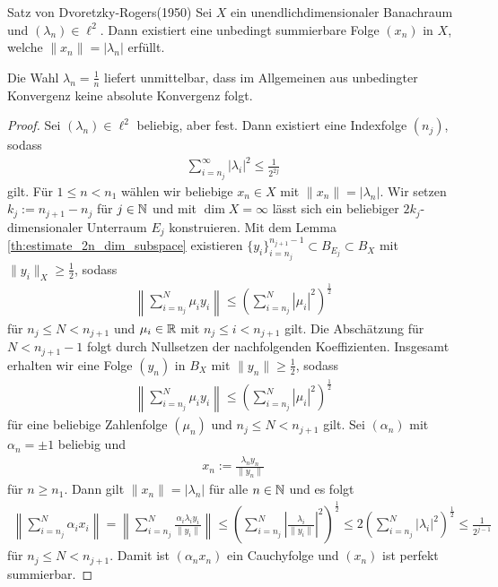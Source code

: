 \begin{genericthm}{Satz von Dvoretzky-Rogers(1950)}\label{th:dvoretzky_rogers}
	Sei $ X $ ein unendlichdimensionaler Banachraum und $ (\lambda_n) \in \ell^2 $.
	Dann existiert eine unbedingt summierbare Folge $ (x_n)  $ in $ X $, welche $  \| x_n \| = | \lambda_n | $ erfüllt.
\end{genericthm}
Die Wahl $ \lambda_n = \frac{1}{n} $ liefert unmittelbar, dass im Allgemeinen aus unbedingter Konvergenz keine absolute Konvergenz folgt.

\begin{proof}
	Sei $ (\lambda_n) \in \ell^2 $ beliebig, aber fest. Dann existiert eine Indexfolge $ (n_j) $, sodass
	\begin{align*}
		\sum 
		\limits_{i = n_j}^\infty | \lambda_i |^2 \leq \frac{1}{2^{2j}}
	\end{align*}
	gilt.
	Für $ 1 \leq n < n_1 $ wählen wir beliebige $ x_n \in X$ mit $ \|x_n\| = |\lambda_{n} |$.
	Wir setzen $ k_j := n_{j+1} - n_j $ für $ j \in \mathbb{N} $ und mit $ \dim X = \infty $ lässt sich ein beliebiger $ 2 k_j $-dimensionaler Unterraum $ E_j $ konstruieren.
	Mit dem Lemma \ref{th:estimate_2n_dim_subspace} existieren $ \{y_i \}_{i = n_j}^{n_{j+1} - 1} \subset B_{E_j} \subset B_X $ mit $ \| y_i \|_X \geq \frac{1}{2} $, sodass
	\begin{align*}
		\left\|
		\sum \limits_{i = n_j}^N \mu_i y_i
		\right\|
		\leq 
		\left(
		\sum \limits_{i = n_j}^N
		|\mu_i|^2
		\right)^\frac{1}{2}
	\end{align*}
	für $ n_j \leq N < n_{j+1} $ und $ \mu_{i} \in \mathbb{R} $ mit $ n_j \leq i  <n_{j+1} $ gilt.
	Die Abschätzung für $ N < n_{j+1} - 1 $ folgt durch Nullsetzen der nachfolgenden Koeffizienten.
	Insgesamt erhalten wir eine Folge $ (y_n) $ in $ B_X $ mit $ \| y_n \| \geq \frac{1}{2} $, sodass
	\begin{align*}
		\left\|
		\sum \limits_{i = n_j}^N \mu_i y_i
		\right\|
		\leq 
		\left(
		\sum \limits_{i = n_j}^N
		|\mu_i|^2
		\right)^\frac{1}{2}
	\end{align*}
	für eine beliebige Zahlenfolge $ (\mu_n) $ und $ n_j \leq N < n_{j+1} $ gilt.
	Sei $ (\alpha_n) $ mit $ \alpha_n = \pm 1 $ beliebig und 
	\begin{align*}
		x_n := \frac{\lambda_n y_n}{\|y_n\|}
	\end{align*}
	für $ n \geq n_1 $. Dann gilt $ \| x_n \| = | \lambda_n | $ für alle $ n \in \mathbb{N} $ und es folgt 
	\begin{align*}
		\left\|
		\sum \limits_{i = n_j}^N \alpha_i x_i
		\right\|
		=
		\left\|
		\sum \limits_{i = n_j}^N  \frac{\alpha_i \lambda_i y_i}{\|y_i\|}
		\right\|
		\leq
		\left(
		\sum \limits_{i = n_j}^N
		\left|\frac{\lambda_i }{\|y_i \|}\right|^2
		\right)^\frac{1}{2}
		\leq  
		2\left(
		\sum \limits_{i = n_j}^N
		\left|\lambda_i \right|^2
		\right)^\frac{1}{2}
		\leq \frac{1}{2^{j-1}}
	\end{align*}
	für $ n_j \leq N < n_{j+1} $.
	Damit ist $ (\alpha_n x_n) $ ein Cauchyfolge und $ (x_n) $ ist perfekt summierbar.
\end{proof}

